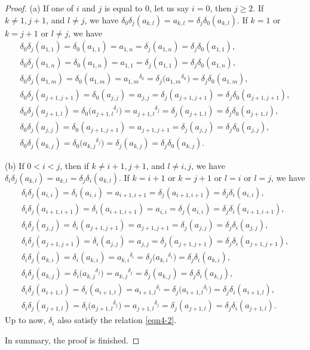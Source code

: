 \documentclass[pdftex]{sigma}
\numberwithin{equation}{section}
\def\lrb#1{\left(#1\right)}
\def\d{\delta}
\begin{document}
\begin{proof}
(a) If one of $i$ and $j$ is equal to $0$, let us say $i=0$, then $j\ge 2$.
If $ k \neq 1, j+1$, and $ l \neq j$, we have
$ \d_0\d_j\lrb{a_{k,l}}=a_{k,l}=\d_j\d_0\lrb{a_{k,l}}$.
If $ k = 1$ or $k=j+1$ or $l \neq j$, we have
\begin{gather*}
 \d_0\d_j\lrb{a_{1,1}}=\d_0\lrb{a_{1,1}}=a_{1,n}=\d_j\lrb{a_{1,n}}=\d_j\d_0\lrb{a_{1,1}},\\
 \d_0\d_j\lrb{a_{1,n}}=\d_0\lrb{a_{1,n}}=a_{1,1}=\d_j\lrb{a_{1,1}}=\d_j\d_0\lrb{a_{1,n}},\\
 \d_0\d_j\lrb{a_{1,m}}=\d_0\lrb{a_{1,m}}={a_{1,m}}^{\d_{0}}
=\d_j\bigl({a_{1,m}}^{\d_{0}}\bigr)=\d_j\d_0\lrb{a_{1,m}},\\
 \d_0\d_j\lrb{a_{j+1,j+1}}=\d_0\lrb{a_{j,j}}=a_{j,j}=\d_j\lrb{a_{j+1,j+1}}=\d_j\d_0 \lrb{a_{j+1,j+1}},\\
 \d_0\d_j\lrb{a_{j+1,l}}=\d_0\bigl({a_{j+1,l}}^{\d_{j}}\bigr)
={a_{j+1,l}}^{\d_{j}}=\d_j\lrb{a_{j+1,l}}=\d_j\d_0\lrb{a_{j+1,l}},\\
 \d_0\d_j\lrb{a_{j,j}}=\d_0\lrb{a_{j+1,j+1}}=a_{j+1,j+1}=\d_j\lrb{a_{j,j}} =\d_j\d_0\lrb{a_{j,j}},\\
 \d_0\d_j\lrb{a_{k,j}}=\d_0\bigl({a_{k,j}}^{\d_{j}}\bigr)
=\d_j\lrb{a_{k,j}}=\d_j\d_0\lrb{a_{k,j}}.
\end{gather*}

(b) If $0<i <j$, then if $ k \neq i+1, j+1$, and $l \neq i, j$, we have
$\d_i\d_j\lrb{a_{k,l}}=a_{k,l}=\d_j\d_i\lrb{a_{k,l}}$.
If $k=i+1$ or $k=j+1$ or $l=i$ or $l=j$, we have
\begin{gather*}
 \d_i\d_j\lrb{a_{i,i}}=\d_i\lrb{a_{i,i}}=a_{i+1,i+1}=\d_j\lrb{a_{i+1,i+1}} =\d_j\d_i\lrb{a_{i,i}},\\
 \d_i\d_j\lrb{a_{i+1,i+1}}=\d_i\lrb{a_{i+1,i+1}}=a_{i,i}=\d_j\lrb{a_{i,i}} =\d_j\d_i\lrb{a_{i+1,i+1}},\\
 \d_i\d_j\lrb{a_{j,j}}=\d_i\lrb{a_{j+1,j+1}}=a_{j+1,j+1}=\d_j\lrb{a_{j,j}} =\d_j\d_i\lrb{a_{j,j}},\\
 \d_i\d_j\lrb{a_{j+1,j+1}}=\d_i\lrb{a_{j,j}}=a_{j,j}=\d_j\lrb{a_{j+1,j+1}} =\d_j\d_i\lrb{a_{j+1,j+1}},\\
 \d_i\d_j\lrb{a_{k,i}}=\d_i\lrb{a_{k,i}}={a_{k,i}}^{\d_{i}}
=\d_j\bigl({a_{k,i}}^{\d_{i}}\bigr)=\d_j\d_i\lrb{a_{k,i}},\\
 \d_i\d_j\lrb{a_{k,j}}=\d_i\bigl({a_{k,j}}^{\d_{j}} \bigr)
={a_{k,j}}^{\d_{j}}=\d_j\lrb{a_{k,j}} =\d_j\d_i\lrb{a_{k,j}},\\
 \d_i\d_j\lrb{a_{i+1,l}}=\d_i\lrb{a_{i+1,l}}={a_{i+1,l}}^{\d_{i}}
=\d_j\bigl({a_{i+1,l}}^{\d_{i}}\bigr)=\d_j\d_i\lrb{a_{i+1,l}},\\
 \d_i\d_j\lrb{a_{j+1,l}}=\d_i\bigl({a_{j+1,l}}^{\d_{j}}\bigr)={a_{j+1,l}}^{\d_{j}}
=\d_j\lrb{a_{j+1,l}}=\d_j\d_i\lrb{a_{j+1,l}}.
\end{gather*}
Up to now, $\d_i$ also satisfy the relation \eqref{eqn4-2}.

In summary, the proof is finished.
\end{proof}
\end{document}
